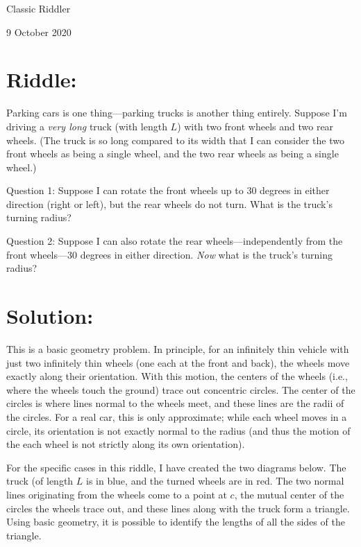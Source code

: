 \documentclass{article}
\begin{document}
\pagestyle{empty} %

\begin{center}
{\LARGE Classic Riddler}

\vspace{0.15in}

{\Large 9 October 2020}
\end{center}


\section*{Riddle:}

Parking cars is one thing---parking trucks is another thing entirely.
Suppose I'm driving a \textit{very long} truck (with length $L$) with two front wheels and two rear wheels.
(The truck is so long compared to its width that I can consider the two front wheels as being a single wheel, and the two rear wheels as being a single wheel.)

Question 1: Suppose I can rotate the front wheels up to 30 degrees in either direction (right or left), but the rear wheels do not turn.
What is the truck's turning radius?

Question 2: Suppose I can also rotate the rear wheels---independently from the front wheels---30 degrees in either direction.
\textit{Now} what is the truck's turning radius?

\section*{Solution:}

This is a basic geometry problem.
In principle, for an infinitely thin vehicle with just two infinitely thin wheels (one each at the front and back), the wheels move exactly along their orientation.
With this motion, the centers of the wheels (i.e., where the wheels touch the ground) trace out concentric circles.
The center of the circles is where lines normal to the wheels meet, and these lines are the radii of the circles.
For a real car, this is only approximate; while each wheel moves in a circle, its orientation is not exactly normal to the radius (and thus the motion of the each wheel is not strictly along its own orientation).

For the specific cases in this riddle, I have created the two diagrams below.
The truck (of length $L$ is in blue, and the turned wheels are in red.
The two normal lines originating from the wheels come to a point at $c$, the mutual center of the circles the wheels trace out, and these lines along with the truck form a triangle.
Using basic geometry, it is possible to identify the lengths of all the sides of the triangle.
\end{document}
